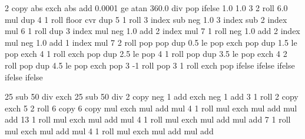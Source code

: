 {\pgfpoint{-50bp}{-50bp}}
{\pgfpoint{50bp}{50bp}}
{}
{ %
  2 copy abs exch abs add 0.0001 ge
  {atan 360.0 div} %
  { pop } %
  ifelse  %
  1.0 1.0 %
  3 2 roll 6.0 mul dup 4 1 roll %
  floor cvr  %
  dup 5 1 roll %
  3 index sub neg %
  1.0 3 index sub %
  2 index mul %
  6 1 roll %
  dup 3 index mul neg 1.0 add %
  2 index mul %
  7 1 roll %
  neg 1.0 add %
  2 index mul neg 1.0  add %
  1 index mul %
  7 2 roll %
  pop pop %
  dup 0.5 le %
  { %
    pop exch pop
  }
  { dup 1.5 le %
    { %
      pop exch 4 1 roll exch pop
    }
    { dup 2.5 le %
      { %
        pop 4 1 roll pop
      }
      { dup 3.5 le %
        { %
          pop exch 4 2 roll pop
        }
        { dup 4.5 le %
          { %
            pop exch pop 3 -1 roll
          }
          { %
            pop 3 1 roll exch pop
          }
          ifelse
        }
        ifelse %
      }
      ifelse %
    }
    ifelse %
  }
  ifelse %
  \ifpgfshadingmodelcmyk
    \pgffuncshadingrgbtocmyk
  \fi
  \ifpgfshadingmodelgray
    \pgffuncshadingrgbtogray
  \fi
}%



%
%
%
%

{\pgfpointorigin}
{\pgfpoint{100bp}{100bp}}
{
}{
  25 sub 50 div exch 25 sub 50 div 2 copy                   %
  neg 1 add exch neg 1 add                      %
  3 1 roll 2 copy exch 5 2 roll 6 copy 6 copy   %
  \pgf@lib@shadings@llred mul exch \pgf@lib@shadings@lrred mul add mul     %
  4 1 roll
  \pgf@lib@shadings@urred mul exch \pgf@lib@shadings@ulred mul add mul
  add
  13 1 roll
  \pgf@lib@shadings@llgreen mul exch \pgf@lib@shadings@lrgreen mul add mul %
  4 1 roll
  \pgf@lib@shadings@urgreen mul exch \pgf@lib@shadings@ulgreen mul add mul
  add
  7 1 roll
  \pgf@lib@shadings@llblue mul exch \pgf@lib@shadings@lrblue mul add mul   %
  4 1 roll
  \pgf@lib@shadings@urblue mul exch \pgf@lib@shadings@ulblue mul add mul
  add
  \ifpgfshadingmodelcmyk
    \pgffuncshadingrgbtocmyk
  \fi
  \ifpgfshadingmodelgray
    \pgffuncshadingrgbtogray
  \fi
}%



